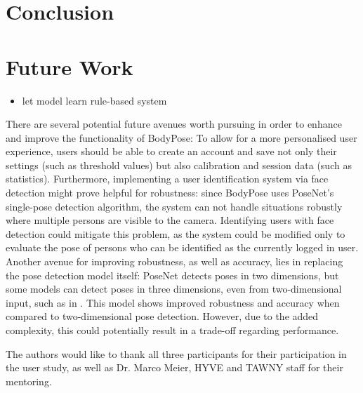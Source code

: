 \section{Conclusion} %
\label{conclusion}

\section{Future Work}
\begin{itemize}
    \item let model learn rule-based system
\end{itemize}
There are several potential future avenues worth pursuing in order to enhance and improve the functionality of BodyPose: To allow for a more personalised user experience, users should be able to create an account and save not only their settings (such as threshold values) but also calibration and session data (such as statistics). Furthermore, implementing a user identification system via face detection might prove helpful for robustness: since BodyPose uses PoseNet's single-pose detection algorithm, the system can not handle situations robustly where multiple persons are visible to the camera. Identifying users with face detection could mitigate this problem, as the system could be modified only to evaluate the pose of persons who can be identified as the currently logged in user. Another avenue for improving robustness, as well as accuracy, lies in replacing the pose detection model itself: PoseNet detects poses in two dimensions, but some models can detect poses in three dimensions, even from two-dimensional input, such as in \cite{Arnab_2019}. This model shows improved robustness and accuracy when compared to two-dimensional pose detection. However, due to the added complexity, this could potentially result in a trade-off regarding performance.

\appendix


\begin{acks} %
  The authors would like to thank all three participants for their participation in the user study, as well as Dr. Marco Meier, HYVE and TAWNY staff for their mentoring.
\end{acks}